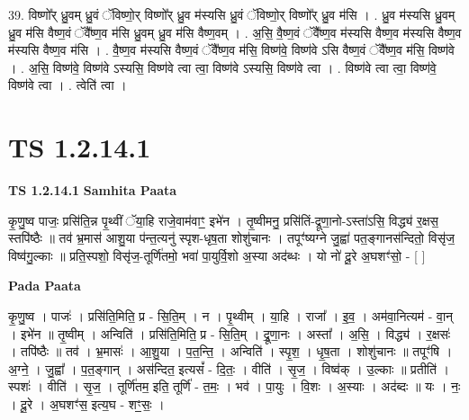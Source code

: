 \documentclass[17pt]{extarticle}
\begin{document}
39. विष्णो᳚र् ध्रु॒वम् ध्रु॒वं ॅविष्णो॒र् विष्णो᳚र् ध्रु॒व म॑स्यसि ध्रु॒वं ॅविष्णो॒र् विष्णो᳚र् ध्रु॒व म॑सि । . ध्रु॒व म॑स्यसि ध्रु॒वम् ध्रु॒व म॑सि वैष्ण॒वं ॅवै᳚ष्ण॒व म॑सि ध्रु॒वम् ध्रु॒व म॑सि वैष्ण॒वम् । . अ॒सि॒ वै॒ष्ण॒वं ॅवै᳚ष्ण॒व म॑स्यसि वैष्ण॒व म॑स्यसि वैष्ण॒व म॑स्यसि वैष्ण॒व म॑सि । . वै॒ष्ण॒व म॑स्यसि वैष्ण॒वं ॅवै᳚ष्ण॒व म॑सि॒ विष्ण॑वे॒ विष्ण॑वे ऽसि वैष्ण॒वं ॅवै᳚ष्ण॒व म॑सि॒ विष्ण॑वे । . अ॒सि॒ विष्ण॑वे॒ विष्ण॑वे ऽस्यसि॒ विष्ण॑वे त्वा त्वा॒ विष्ण॑वे ऽस्यसि॒ विष्ण॑वे त्वा । . विष्ण॑वे त्वा त्वा॒ विष्ण॑वे॒ विष्ण॑वे त्वा । . त्वेति॑ त्वा । \newline
\pagebreak
{}

\section{ TS 1.2.14.1 }

\textbf{TS 1.2.14.1 } \newline
\textbf{Samhita Paata} \newline

कृ॒णु॒ष्व पाजः॒ प्रसि॑ति॒न्न पृ॒थ्वीं ॅया॒हि राजे॒वाम॑वाꣳ॒॒ इभे॑न । तृ॒ष्वीमनु॒ प्रसि॑तिं-द्रूणा॒नो-ऽस्ता॑ऽसि॒ विद्ध्य॑ र॒क्षस॒ स्तपि॑ष्ठैः ॥ तव॑ भ्र॒मास॑ आशु॒या प॑न्त॒त्यनु॑ स्पृश-धृष॒ता शोशु॑चानः । तपूꣳ॑ष्यग्ने जु॒ह्वा॑ पत॒ङ्गानस॑न्दितो॒ विसृ॑ज॒ विष्व॑गु॒ल्काः ॥ प्रति॒स्पशो॒ विसृ॑ज॒-तूर्णि॑तमो॒ भवा॑ पा॒युर्वि॒शो अ॒स्या अद॑ब्धः । यो नो॑ दू॒रे अ॒घशꣳ॑सो॒ - [ ] \newline

\textbf{Pada Paata} \newline

कृ॒णु॒ष्व । पाजः॑ । प्रसि॑ति॒मिति॒ प्र - सि॒ति॒म् । न । पृ॒थ्वीम् । या॒हि । राजा᳚ । इ॒व॒ । अम॑वा॒नित्यम॑ - वा॒न् । इभे॑न ॥ तृ॒ष्वीम् । अन्विति॑ । प्रसि॑ति॒मिति॒ प्र - सि॒ति॒म् । द्रू॒णा॒नः । अस्ता᳚ । अ॒सि॒ । विद्ध्य॑ । र॒क्षसः॑ । तपि॑ष्ठैः ॥ तव॑ । भ्र॒मासः॑ । आ॒शु॒या । प॒त॒न्ति॒ । अन्विति॑ । स्पृ॒श॒ । धृ॒ष॒ता । शोशु॑चानः ॥ तपूꣳ॑षि । अ॒ग्ने॒ । जु॒ह्वा᳚ । प॒त॒ङ्गान् । अस॑न्दित॒ इत्यसं᳚ - दि॒तः॒ । वीति॑ । सृ॒ज॒ । विष्व॑क् । उ॒ल्काः ॥ प्रतीति॑ । स्पशः॑ । वीति॑ । सृ॒ज॒ । तूर्णि॑तम॒ इति॒ तूर्णि॑ - त॒मः॒ । भव॑ । पा॒युः । वि॒शः । अ॒स्याः । अद॑ब्दः ॥ यः । नः॒ । दू॒रे । अ॒घशꣳ॑स॒ इत्य॒घ - शꣳ॒॒सः॒ ।  \newline
\end{document}
